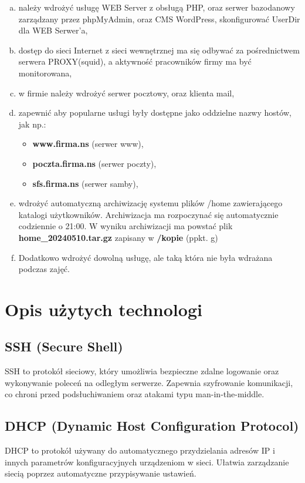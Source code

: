 \documentclass[a4paper]{article}
\newcommand*{\fg}[4][!htb]{
      \begin{figure*}[#1]
      \texttt{[image: \#3]}
      \caption{#4}
      \end{figure*}
}
\begin{document}
\begin{enumerate}[a)]
      \item należy wdrożyć usługę WEB Server z obsługą PHP, oraz serwer bazodanowy zarządzany przez 
      phpMyAdmin, oraz CMS WordPress, skonfigurować UserDir dla WEB Serwer'a,
      \item dostęp do sieci Internet z sieci wewnętrznej ma się odbywać za pośrednictwem serwera 
      PROXY(squid), a aktywność pracowników firmy ma być monitorowana,
      \item w firmie należy wdrożyć serwer pocztowy, oraz klienta mail, 
      \item zapewnić aby popularne usługi były dostępne jako oddzielne nazwy hostów, jak np.: 
            \begin{itemize}
                  \item \textbf{www.firma.ns} (serwer www), 
                  \item \textbf{poczta.firma.ns} (serwer poczty), 
                  \item \textbf{sfs.firma.ns} (serwer samby), 
            \end{itemize}
      \item wdrożyć automatyczną archiwizację systemu plików /home zawierającego katalogi użytkowników. Archiwizacja ma rozpoczynać się automatycznie codziennie o 21:00. W wyniku archiwizacji ma powstać plik\\ \textbf{home\_20240510.tar.gz} zapisany w \textbf{/kopie} (ppkt. g)
      \item Dodatkowo wdrożyć dowolną usługę, ale taką która nie była wdrażana podczas zajęć.
       
\end{enumerate}
\section{Opis użytych technologi}
\subsection{SSH (Secure Shell)}
SSH to protokół sieciowy, który umożliwia bezpieczne zdalne logowanie oraz wykonywanie poleceń na odległym serwerze. Zapewnia szyfrowanie komunikacji, co chroni przed podsłuchiwaniem oraz atakami typu man-in-the-middle.

\subsection{DHCP (Dynamic Host Configuration Protocol)}
DHCP to protokół używany do automatycznego przydzielania adresów IP i innych parametrów konfiguracyjnych urządzeniom w sieci. Ułatwia zarządzanie siecią poprzez automatyczne przypisywanie ustawień.
\end{document}

